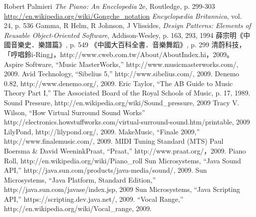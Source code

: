 \begin{thebibliography}{99} %
  Robert Palmieri
  \emph{The Piano: An Encclopedia}
  2e,
  Routledge,  
  p. 299-303
  \url{http://en.wikipedia.org/wiki/Gongche_notation}
  \emph{Encyclopædia Britannica}, vol. 24, p. 536
  Gamma, R Helm, R Johnson, J Vlissides, 
  \emph{Design Patterns: Elements of Reusable Object-Oriented Software},
  Addison-Wesley, p. 163, 293, 
  1994
  薛宗明《中國音樂史．樂譜篇》, p. 549
  《中國大百科全書．音樂舞蹈》, p. 299
   清蔚科技，「哼唱鈴i-Ring」，http://www.cweb.com.tw/About/AboutIndex.hi，2009。
   Aspire Software, “Music MasterWorks,” http://www.musicmasterworks.com/, 2009.
   Avid Technology, “Sibelius 5,” http://www.sibelius.com/, 2009.
   Denemo 0.82, http://www.denemo.org/, 2009.
   Eric Taylor, “The AB Guide to Music Theory Part I,” The Associated Board of the Royal Schools of Music, p. 17, 1989. 
   Sound Pressure, http://en.wikipedia.org/wiki/Sound_pressure, 2009
   Tracy V. Wilson, “How Virtual Surround Sound Works” http://electronics.howstuffworks.com/virtual-surround-sound.htm/printable, 2009
   LilyPond, http://lilypond.org/, 2009.
   MakeMusic, “Finale 2009,” http://www.finalemusic.com/, 2009.
   MIDI Tuning Standard (MTS) %
   Paul Boersma & David WeeninkPraat, “Praat,” http://www.praat.org/，2009.
   Piano Roll, http://en.wikipedia.org/wiki/Piano_roll
   Sun Microsystems, “Java Sound API,” http://java.sun.com/products/java-media/sound/, 2009.
   Sun Microsystems, “Java Platform, Standard Edition,” http://java.sun.com/javase/index.jsp, 2009
   Sun Microsystems, “Java Scripting API,” https://scripting.dev.java.net/, 2009.
   “Vocal Range,” http://en.wikipedia.org/wiki/Vocal_range, 2009.
\end{thebibliography}


